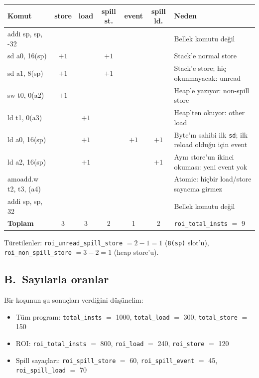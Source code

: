 \documentclass[10pt,a4paper]{article}
\newcommand{\ct}[1]{\texttt{#1}}
\begin{document}
{\small
\begin{tabularx}{\textwidth}{@{}>{\ttfamily}l c c c c c X@{}}
\toprule
\normalfont\textbf{Komut} & \textbf{store} & \textbf{load}
  & \textbf{spill st.} & \textbf{event} & \textbf{spill ld.} & \textbf{Neden} \\
\midrule
addi sp, sp, -32 & & & & & & Bellek komutu de\u{g}il \\
sd a0, 16(sp) & $+1$ & & $+1$ & & & Stack'e normal store \\
sd a1, 8(sp) & $+1$ & & $+1$ & & & Stack'e store; hi\c{c} okunmayacak: unread \\
sw t0, 0(a2) & $+1$ & & & & & Heap'e yaz{\i}yor: non-spill store \\
ld t1, 0(a3) & & $+1$ & & & & Heap'ten okuyor: other load \\
ld a0, 16(sp) & & $+1$ & & $+1$ & $+1$ & Byte'{\i}n sahibi ilk \ct{sd}; ilk
  reload oldu\u{g}u i\c{c}in event \\
ld a2, 16(sp) & & $+1$ & & & $+1$ & Ayn{\i} store'un ikinci okumas{\i}: yeni
  event yok \\
amoadd.w t2, t3, (a4) & & & & & & Atomic: hi\c{c}bir load/store sayac{\i}na
  girmez \\
addi sp, sp, 32 & & & & & & Bellek komutu de\u{g}il \\
\midrule
\normalfont\textbf{Toplam} & 3 & 3 & 2 & 1 & 2 & \ct{roi\_total\_insts} $=$ 9 \\
\bottomrule
\end{tabularx}
}

T\"uretilenler: \ct{roi\_unread\_spill\_store} $= 2 - 1 = 1$ (\ct{8(sp)}
slot'u), \ct{roi\_non\_spill\_store} $= 3 - 2 = 1$ (heap store'u).

\subsection*{B.\ Say{\i}larla oranlar}

Bir ko\c{s}unun \c{s}u sonu\c{c}lar{\i} verdi\u{g}ini d\"u\c{s}\"unelim:
\begin{itemize}
\setlength{\itemsep}{1pt}\setlength{\topsep}{2pt}
\item T\"um program: \ct{total\_insts} $=$ 1000, \ct{total\_load} $=$ 300,
  \ct{total\_store} $=$ 150
\item ROI: \ct{roi\_total\_insts} $=$ 800, \ct{roi\_load} $=$ 240,
  \ct{roi\_store} $=$ 120
\item Spill saya\c{c}lar{\i}: \ct{roi\_spill\_store} $=$ 60,
  \ct{roi\_spill\_event} $=$ 45, \ct{roi\_spill\_load} $=$ 70
\end{itemize}
\end{document}
